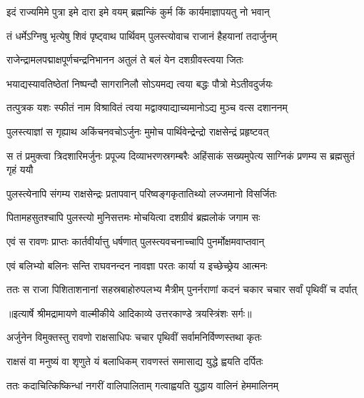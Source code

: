 \twolineshloka
{इदं राज्यमिमे पुत्रा इमे दारा इमे वयम्}
{ब्रह्मन्किं कुर्म किं कार्यमाज्ञापयतु नो भवान्} %

\twolineshloka
{तं धर्मेऽग्निषु भृत्येषु शिवं पृष्ट्वाथ पार्थिवम्}
{पुलस्त्योवाच राजानं हैहयानां तदार्जुनम्} %

\twolineshloka
{राजेन्द्रामलपद्माक्षपूर्णचन्द्रनिभानन}
{अतुलं ते बलं येन दशग्रीवस्त्वया जितः} %

\twolineshloka
{भयाद्यस्यावतिष्ठेतां निष्पन्दौ सागरानिलौ}
{सोऽयमद्य त्वया बद्धः पौत्रो मेऽतीवदुर्जयः} %

\twolineshloka
{तत्पुत्रक यशः स्फीतं नाम विश्रावितं त्वया}
{मद्वाक्याद्याच्यमानोऽद्य मुञ्च वत्स दशाननम्} %

\twolineshloka
{पुलस्त्याज्ञां स गृह्याथ अकिंचनवचोऽर्जुनः}
{मुमोच पार्थिवेन्द्रेन्द्रो राक्षसेन्द्रं प्रहृष्टवत्} %

\fourlineindentedshloka
{स तं प्रमुक्त्वा त्रिदशारिमर्जुनः}
{ प्रपूज्य दिव्याभरणस्रगम्बरैः}
{अहिंसाकं सख्यमुपेत्य साग्निकं}
{ प्रणम्य स ब्रह्मसुतं गृहं ययौ} %

\twolineshloka
{पुलस्त्येनापि संगम्य राक्षसेन्द्रः प्रतापवान्}
{परिष्वङ्गकृतातिथ्यो लज्जमानो विसर्जितः} %

\twolineshloka
{पितामहसुतश्चापि पुलस्त्यो मुनिसत्तमः}
{मोचयित्वा दशग्रीवं ब्रह्मलोकं जगाम सः} %

\twolineshloka
{एवं स रावणः प्राप्तः कार्तवीर्यात्तु धर्षणात्}
{पुलस्त्यवचनाच्चापि पुनर्मोक्षमवाप्तवान्} %

\twolineshloka
{एवं बलिभ्यो बलिनः सन्ति राघवनन्दन}
{नावज्ञा परतः कार्या य इच्छेच्छ्रेय आत्मनः} %

\fourlineindentedshloka
{ततः स राजा पिशिताशनानां}
{ सहस्रबाहोरुपलभ्य मैत्रीम्}
{पुनर्नराणां कदनं चकार}
{ चचार सर्वां पृथिवीं च दर्पात्} %


{॥इत्यार्षे श्रीमद्रामायणे वाल्मीकीये आदिकाव्ये उत्तरकाण्डे त्रयस्त्रिंशः सर्गः॥}


\twolineshloka
{अर्जुनेन विमुक्तस्तु रावणो राक्षसाधिपः}
{चचार पृथिवीं सर्वामनिर्विण्णस्तथा कृतः} %

\twolineshloka
{राक्षसं वा मनुष्यं वा शृणुते यं बलाधिकम्}
{रावणस्तं समासाद्य युद्धे ह्वयति दर्पितः} %

\twolineshloka
{ततः कदाचित्किष्किन्धां नगरीं वालिपालिताम्}
{गत्वाह्वयति युद्धाय वालिनं हेममालिनम्} %

